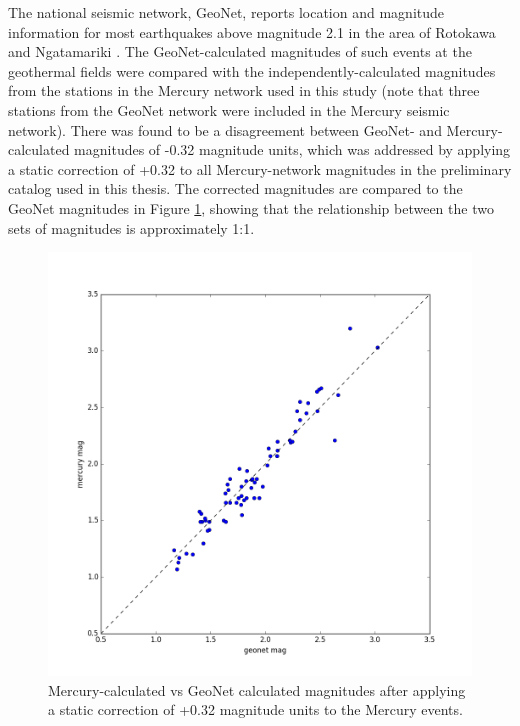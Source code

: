 The national seismic network, GeoNet, reports location and magnitude information for most earthquakes above magnitude 2.1 in the area of Rotokawa and Ngatamariki \citep{Sherburn_2015}. The GeoNet-calculated magnitudes of such events at the geothermal fields were compared with the independently-calculated magnitudes from the stations in the Mercury network used in this study (note that three stations from the GeoNet network were included in the Mercury seismic network). There was found to be a disagreement between GeoNet- and Mercury-calculated magnitudes of -0.32 magnitude units, which was addressed by applying a static correction of +0.32 to all Mercury-network magnitudes in the preliminary catalog used in this thesis. The corrected magnitudes are compared to the GeoNet magnitudes in Figure \ref{910533}, showing that the relationship between the two sets of magnitudes is approximately 1:1.

\begin{figure}[h!]
\begin{center}
\includegraphics[width=0.70\columnwidth]{Chapter_2_Data/figures/geonet-merc_mag_comp/geonet-merc_mag_comp_original}
\caption{{Mercury-calculated vs GeoNet calculated magnitudes after applying a
static correction of +0.32 magnitude units to the Mercury events.
{\label{910533}}%
}}
\end{center}
\end{figure}

